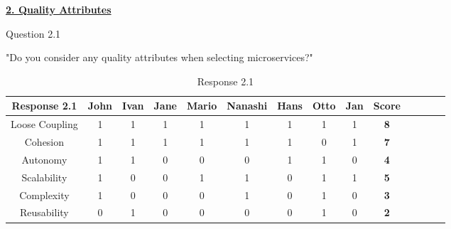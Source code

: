 \textbf{\underline{2. Quality Attributes}}\\
\begin{shaded} Question 2.1 \end{shaded} \label{question:hybris_architecture/interview/question_2.1}
"Do you consider any quality attributes when selecting microservices?"\\
\begin{table}[H]
\centering
\begin{adjustbox}{max width=\textwidth}
\begin{tabular}{*{14}{|c}|}%
\hline
\textbf{Response 2.1}   & John & Ivan & Jane & Mario & Nanashi & Hans & Otto & Jan & \textbf{Score}\\
 \hline
Loose Coupling          & 1 & 1 & 1 & 1 & 1 & 1 & 1 & 1 & \textbf{8}    \\ 
 \hline
Cohesion                & 1 & 1 & 1 & 1 & 1 & 1 & 0 & 1 & \textbf{7}    \\ 
 \hline
 Autonomy               & 1 & 1 & 0 & 0 & 0 & 1 & 1 & 0 & \textbf{4}    \\ 
 \hline
 Scalability            & 1 & 0 & 0 & 1 & 1 & 0 & 1 & 1 & \textbf{5}    \\ 
 \hline
 Complexity             & 1 & 0 & 0 & 0 & 1 & 0 & 1 & 0 & \textbf{3}    \\ 
 \hline
 Reusability            & 0 & 1 & 0 & 0 & 0 & 0 & 1 & 0 & \textbf{2}    \\ 
 \hline
 \hline
\end{tabular}
\end{adjustbox}
\caption{Response 2.1}
\label{tab:hybris_architecture/interview/question_two_one}
\end{table}
\\

